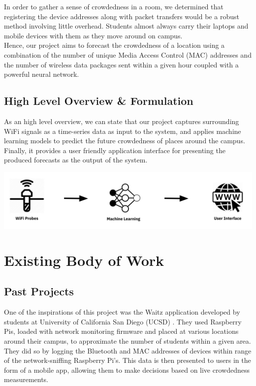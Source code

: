 \documentclass[journal, 12pt]{IEEEtran}
\begin{document}
\noindent In order to gather a sense of crowdedness in a room, we determined that registering the device addresses along with packet transfers would be a robust method involving little overhead. Students almost always carry their laptops and mobile devices with them as they move around on campus. \\

\noindent Hence, our project aims to forecast the crowdedness of a location using a combination of the number of unique Media Access Control (MAC) addresses and the number of wireless data packages sent within a given hour coupled with a powerful neural network. 

\subsection{High Level Overview \& Formulation}
\noindent As an high level overview, we can state that our project captures surrounding WiFi signals as a time-series data as input to the system, and applies machine learning models to predict the future crowdedness of places around the campus. Finally, it provides a user friendly application interface for presenting the produced forecasts as the output of the system.

\begingroup
    \centering
    \medskip
    \includegraphics[width=\columnwidth]{./images/formulation.png}
    \label{fig:formulation}
    \medskip
\endgroup


\section{Existing Body of Work}
\subsection{Past Projects}
\noindent One of the inspirations of this project was the Waitz application developed by students at University of California San Diego (UCSD) \cite{waitz}. They used Raspberry Pis, loaded with network monitoring firmware and placed at various locations around their campus, to approximate the number of students within a given area. They did so by logging the Bluetooth and MAC addresses of devices within range of the network-sniffing Raspberry Pi's. This data is then presented to users in the form of a mobile app, allowing them to make decisions based on live crowdedness measurements.\\
\end{document}
